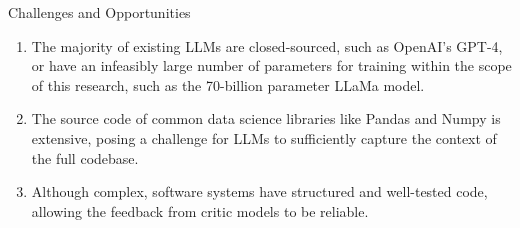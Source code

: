 


\begin{frame}{Challenges and Opportunities}
    \begin{enumerate}
        \item The majority of existing LLMs are closed-sourced, such as OpenAI's GPT-4, or have an infeasibly large number of parameters for training within the scope of this research, such as the 70-billion parameter LLaMa model.

        \item The source code of common data science libraries like Pandas and Numpy is extensive, posing a challenge for LLMs to sufficiently capture the context of the full codebase.

        \item Although complex, software systems have structured and well-tested code, allowing the feedback from critic models to be reliable.
    \end{enumerate}
\end{frame}

